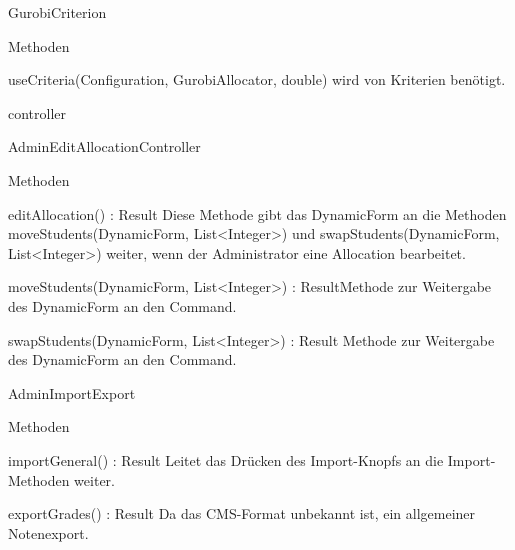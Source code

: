 \documentclass[parskip=full]{scrartcl}
\newcommand{\changeDescription}[1]{{\newline\color{black}\normalfont #1}}
\newcommand{\code}[1]{{\ttfamily #1}}
\begin{document}
\begin{itemPackage}
\begin{itemClass}
\begin{itemClassSub}
\end{itemClassSub}
\item GurobiCriterion
\begin{itemClassSub}
\item Methoden
\begin{itemChange}
\item useCriteria(Configuration, GurobiAllocator, double)
\changeDescription{\code{GurobiAllocator} wird von Kriterien benötigt.}
\end{itemChange}
\end{itemClassSub}
\end{itemClass}
\item controller
\begin{itemClass}
\item AdminEditAllocationController
\begin{itemClassSub}
\item Methoden
\begin{itemPlus}
\item editAllocation() : Result \changeDescription{Diese Methode gibt das
\code{DynamicForm} an die Methoden \code{moveStudents(DynamicForm, List<Integer>)} und
\code{swapStudents(DynamicForm, List<Integer>)} weiter, wenn der Administrator
eine Allocation bearbeitet. }
\end{itemPlus}
\begin{itemChange}
\item moveStudents(DynamicForm, List<Integer>) : Result\changeDescription{Methode zur Weitergabe des \code{DynamicForm} an den
\code{Command}.}
\item swapStudents(DynamicForm, List<Integer>) : Result
\changeDescription{Methode zur Weitergabe des \code{DynamicForm} an den
\code{Command}.}
\end{itemChange}
\end{itemClassSub}
\item AdminImportExport
\item \begin{itemClassSub}
\item Methoden
\begin{itemPlus}
\item importGeneral() : Result \changeDescription{Leitet das Drücken des
Import-Knopfs an die Import-Methoden weiter.}
\item exportGrades() : Result \changeDescription{Da das CMS-Format unbekannt
ist, ein allgemeiner Notenexport.}
\end{itemPlus}
\end{itemClassSub}

\end{itemClass}
\end{itemPackage}
\end{document}
